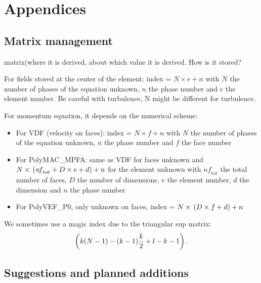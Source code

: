 
\chapter{Appendices}

\section{Matrix management}
matrix(where it is derived, about which value it is derived. How is it stored?

For fields stored at the center of the element: index = $N\times{}e + n$ with $N$ the number of phases of the equation unknown, $n$ the phase number and $e$ the element number. Be careful with turbulence, N might be different for turbulence.

For momentum equation, it depends on the numerical scheme:
\begin{itemize}
\item[\small \textcolor{blue}{\ding{109}}]For VDF (velocity on faces): index = $N\times{}f + n$ with $N$ the number of phases of the equation unknown, $n$ the phase number and $f$ the face number
\item[\small \textcolor{blue}{\ding{109}}]For PolyMAC\_MPFA: same as VDF for faces unknown and $N\times{}\left( \mathit{nf}_{\text{tot}} + D\times{}e + d \right) + n$ for the element unknown with $\mathit{nf}_{\text{tot}}$ the total number of faces, $D$ the number of dimensions, $e$ the element number, $d$ the dimension and $n$ the phase number
\item[\small \textcolor{blue}{\ding{109}}]For PolyVEF\_P0, only unknown on faces, index = $N\times{}\left( D\times{}f + d \right) + n$
\end{itemize}

We sometimes use a magic index due to the triangular sup matrix:
\begin{equation}
    \left( k(N-1) - (k-1)\frac{k}{2} + l-k-1 \right).
\end{equation}

\section{Suggestions and planned additions}
